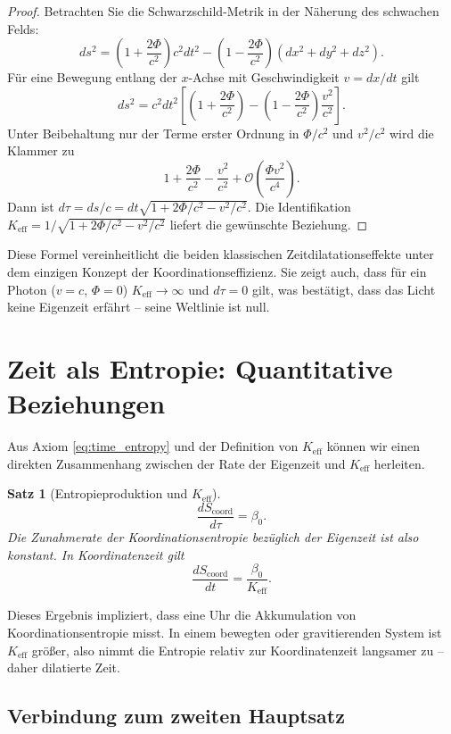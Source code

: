 \documentclass[12pt,a4paper]{article}
\newtheorem{theorem}{Satz}[section]
\newcommand{\Keff}{K_{\mathrm{eff}}}
\newcommand{\Scoord}{S_{\mathrm{coord}}}
\begin{document}
	\begin{proof}
		Betrachten Sie die Schwarzschild-Metrik in der Näherung des schwachen Felds:
		\[
		ds^2 = \left(1+\frac{2\Phi}{c^2}\right)c^2 dt^2 - \left(1-\frac{2\Phi}{c^2}\right)(dx^2+dy^2+dz^2).
		\]
		Für eine Bewegung entlang der \(x\)-Achse mit Geschwindigkeit \(v = dx/dt\) gilt
		\[
		ds^2 = c^2 dt^2\left[ \left(1+\frac{2\Phi}{c^2}\right) - \left(1-\frac{2\Phi}{c^2}\right)\frac{v^2}{c^2} \right].
		\]
		Unter Beibehaltung nur der Terme erster Ordnung in \(\Phi/c^2\) und \(v^2/c^2\) wird die Klammer zu
		\[
		1 + \frac{2\Phi}{c^2} - \frac{v^2}{c^2} + \mathcal{O}\left(\frac{\Phi v^2}{c^4}\right).
		\]
		Dann ist \(d\tau = ds/c = dt\sqrt{1 + 2\Phi/c^2 - v^2/c^2}\). Die Identifikation \(\Keff = 1/\sqrt{1 + 2\Phi/c^2 - v^2/c^2}\) liefert die gewünschte Beziehung.
	\end{proof}
	
	Diese Formel vereinheitlicht die beiden klassischen Zeitdilatationseffekte unter dem einzigen Konzept der Koordinationseffizienz. Sie zeigt auch, dass für ein Photon (\(v=c\), \(\Phi=0\)) \(\Keff \to \infty\) und \(d\tau = 0\) gilt, was bestätigt, dass das Licht keine Eigenzeit erfährt – seine Weltlinie ist null.
	
	\section{Zeit als Entropie: Quantitative Beziehungen}
	\label{sec:entropy}
	
	Aus Axiom \ref{eq:time_entropy} und der Definition von \(\Keff\) können wir einen direkten Zusammenhang zwischen der Rate der Eigenzeit und \(\Keff\) herleiten.
	
	\begin{theorem}[Entropieproduktion und \(\Keff\)]
		\[
		\frac{d\Scoord}{d\tau} = \beta_0.
		\]
		Die Zunahmerate der Koordinationsentropie bezüglich der Eigenzeit ist also konstant. In Koordinatenzeit gilt
		\[
		\frac{d\Scoord}{dt} = \frac{\beta_0}{\Keff}.
		\]
	\end{theorem}
	
	Dieses Ergebnis impliziert, dass eine Uhr die Akkumulation von Koordinationsentropie misst. In einem bewegten oder gravitierenden System ist \(\Keff\) größer, also nimmt die Entropie relativ zur Koordinatenzeit langsamer zu – daher dilatierte Zeit.
	
	\subsection{Verbindung zum zweiten Hauptsatz}
	
\end{document}
